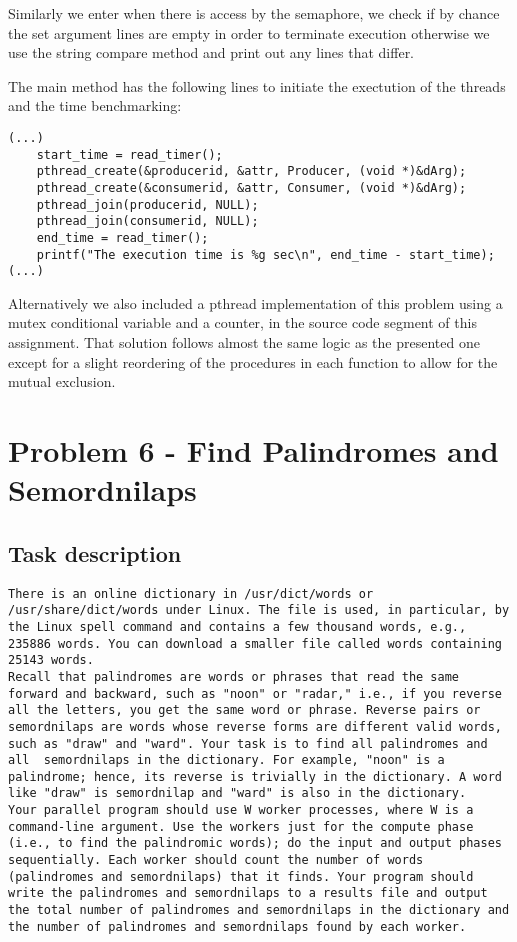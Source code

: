 \documentclass[a4paper,11pt]{article}
\begin{document}
Similarly we enter when there is access by the semaphore, we check if by chance the set argument lines are empty in order to terminate execution otherwise we use the string compare method and print out any lines that differ.

The main method has the following lines to initiate the exectution of the threads and the time benchmarking:

\begin{verbatim}
(...)
    start_time = read_timer();
    pthread_create(&producerid, &attr, Producer, (void *)&dArg);
    pthread_create(&consumerid, &attr, Consumer, (void *)&dArg);
    pthread_join(producerid, NULL);
    pthread_join(consumerid, NULL);
    end_time = read_timer();
    printf("The execution time is %g sec\n", end_time - start_time);
(...)
\end{verbatim}
Alternatively we also included a pthread implementation of this problem using a mutex conditional variable and a counter, in the source code segment of this assignment. That solution follows almost the same logic as the presented one except for a slight reordering of the procedures in each function to allow for the mutual exclusion.

\section*{Problem 6 - Find Palindromes and Semordnilaps}

\subsection*{Task description}

\begin{verbatim}
There is an online dictionary in /usr/dict/words or /usr/share/dict/words under Linux. The file is used, in particular, by the Linux spell command and contains a few thousand words, e.g., 235886 words. You can download a smaller file called words containing 25143 words.
Recall that palindromes are words or phrases that read the same forward and backward, such as "noon" or "radar," i.e., if you reverse all the letters, you get the same word or phrase. Reverse pairs or semordnilaps are words whose reverse forms are different valid words, such as "draw" and "ward". Your task is to find all palindromes and all  semordnilaps in the dictionary. For example, "noon" is a palindrome; hence, its reverse is trivially in the dictionary. A word like "draw" is semordnilap and "ward" is also in the dictionary.
Your parallel program should use W worker processes, where W is a command-line argument. Use the workers just for the compute phase (i.e., to find the palindromic words); do the input and output phases sequentially. Each worker should count the number of words (palindromes and semordnilaps) that it finds. Your program should write the palindromes and semordnilaps to a results file and output the total number of palindromes and semordnilaps in the dictionary and the number of palindromes and semordnilaps found by each worker.
\end{verbatim}
\end{document}
